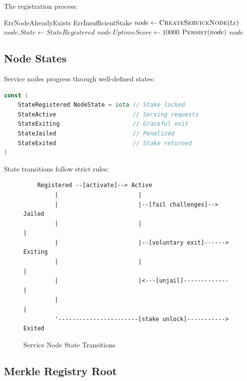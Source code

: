 \documentclass[11pt,a4paper]{article}
\begin{document}
The registration process:

\begin{algorithm}
\caption{Service Node Registration}
\begin{algorithmic}[1]
        \State \Return ErrNodeAlreadyExists
    \EndIf
        \State \Return ErrInsufficientStake
    \EndIf
    \State $node \gets \Call{CreateServiceNode}{tx}$
    \State $node.State \gets StateRegistered$
    \State $node.UptimeScore \gets 10000$ 
    \State $\Call{Persist}{node}$
    \State \Return $node$
\EndProcedure
\end{algorithmic}
\end{algorithm}

\subsection{Node States}

Service nodes progress through well-defined states:

\begin{lstlisting}[language=Go,caption={Node State Machine}]
const (
    StateRegistered NodeState = iota // Stake locked
    StateActive                      // Serving requests
    StateExiting                     // Graceful exit
    StateJailed                      // Penalized
    StateExited                      // Stake returned
)
\end{lstlisting}

State transitions follow strict rules:

\begin{figure}[h]
\centering
\begin{verbatim}
    Registered --[activate]--> Active
         |                       |
         |                       |--[fail challenges]--> Jailed
         |                       |                          |
         |                       |--[voluntary exit]------> Exiting
         |                       |                          |
         |                       |<---[unjail]-------------|
         |                                                  |
         '-----------------------[stake unlock]-----------> Exited
\end{verbatim}
\caption{Service Node State Transitions}
\end{figure}

\subsection{Merkle Registry Root}
\end{document}
